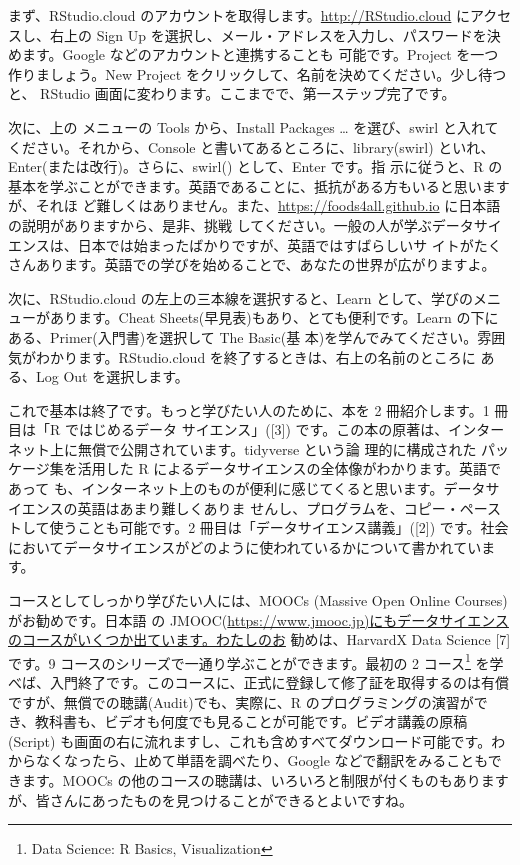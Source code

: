 \documentclass[
]{book}
\theoremstyle{definition}
\theoremstyle{definition}
\theoremstyle{definition}
\theoremstyle{definition}
\theoremstyle{remark}
\begin{document}
まず、RStudio.cloud のアカウントを取得します。\url{http://RStudio.cloud} にアクセスし、右上の Sign Up を選択し、メール・アドレスを入力し、パスワードを決めます。Google などのアカウントと連携することも 可能です。Project を一つ作りましょう。New Project をクリックして、名前を決めてください。少し待つと、 RStudio 画面に変わります。ここまでで、第一ステップ完了です。

次に、上の メニューの Tools から、Install Packages \ldots{} を選び、swirl と入れてください。それから、Console と書いてあるところに、library(swirl) といれ、Enter(または改行)。さらに、swirl() として、Enter です。指 示に従うと、R の基本を学ぶことができます。英語であることに、抵抗がある方もいると思いますが、それほ ど難しくはありません。また、\url{https://foods4all.github.io} に日本語の説明がありますから、是非、挑戦 してください。一般の人が学ぶデータサイエンスは、日本では始まったばかりですが、英語ではすばらしいサ イトがたくさんあります。英語での学びを始めることで、あなたの世界が広がりますよ。

次に、RStudio.cloud の左上の三本線を選択すると、Learn として、学びのメニューがあります。Cheat Sheets(早見表)もあり、とても便利です。Learn の下にある、Primer(入門書)を選択して The Basic(基 本)を学んでみてください。雰囲気がわかります。RStudio.cloud を終了するときは、右上の名前のところに ある、Log Out を選択します。

これで基本は終了です。もっと学びたい人のために、本を 2 冊紹介します。1 冊目は「R ではじめるデータ サイエンス」({[}3{]}) です。この本の原著は、インターネット上に無償で公開されています。tidyverse という論 理的に構成された パッケージ集を活用した R によるデータサイエンスの全体像がわかります。英語であって も、インターネット上のものが便利に感じてくると思います。データサイエンスの英語はあまり難しくありま せんし、プログラムを、コピー・ペーストして使うことも可能です。2 冊目は「データサイエンス講義」({[}2{]}) です。社会においてデータサイエンスがどのように使われているかについて書かれています。

コースとしてしっかり学びたい人には、MOOCs (Massive Open Online Courses) がお勧めです。日本語 の JMOOC(\url{https://www.jmooc.jp)にもデータサイエンスのコースがいくつか出ています。わたしのお} 勧めは、HarvardX Data Science {[}7{]} です。9 コースのシリーズで一通り学ぶことができます。最初の 2 コース\footnote{Data Science: R Basics, Visualization} を学べば、入門終了です。このコースに、正式に登録して修了証を取得するのは有償ですが、無償での聴講(Audit)でも、実際に、R のプログラミングの演習ができ、教科書も、ビデオも何度でも見ることが可能です。ビデオ講義の原稿 (Script) も画面の右に流れますし、これも含めすべてダウンロード可能です。わからなくなったら、止めて単語を調べたり、Google などで翻訳をみることもできます。MOOCs の他のコースの聴講は、いろいろと制限が付くものもありますが、皆さんにあったものを見つけることができるとよいですね。
\end{document}
